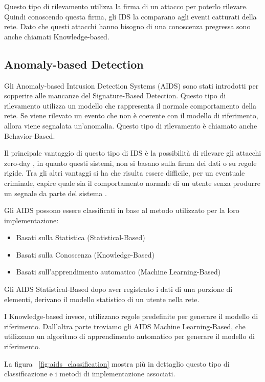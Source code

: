Questo tipo di rilevamento utilizza la firma di un attacco per poterlo rilevare. Quindi conoscendo questa firma, gli IDS la comparano agli eventi catturati della rete. Dato che questi attacchi hanno bisogno di una conoscenza pregressa sono anche chiamati Knowledge-based.


\subsection{Anomaly-based Detection}

Gli Anomaly-based Intrusion Detection Systems (AIDS) sono stati introdotti per sopperire alle mancanze del Signature-Based Detection.
Questo tipo di rilevamento utilizza un modello che rappresenta il normale comportamento della rete. Se viene rilevato un evento che non è coerente con il modello di riferimento, allora viene segnalata un'anomalia. Questo tipo di rilevamento è chiamato anche Behavior-Based.


Il principale vantaggio di questo tipo di IDS è la possibilità di rilevare gli attacchi zero-day \cite{UnsupervisedAlgorithmsDetect2021}, in quanto questi sistemi, non si basano sulla firma dei dati o su regole rigide. Tra gli altri vantaggi si ha che risulta essere difficile, per un eventuale criminale, capire quale sia il comportamento normale di un utente senza produrre un segnale da parte del sistema \cite{SurveyIntrusionDetection2019}.


Gli AIDS possono essere classificati in base al metodo utilizzato per la loro implementazione:

\begin{itemize}
    \item Basati sulla Statistica (Statistical-Based)
    \item Basati sulla Conoscenza (Knowledge-Based)
    \item Basati sull'apprendimento automatico (Machine Learning-Based)
\end{itemize}


Gli AIDS Statistical-Based dopo aver registrato i dati di una porzione di elementi, derivano il modello statistico di un utente nella rete. 


I Knowledge-based invece, utilizzano regole predefinite per generare il modello di riferimento.
Dall'altra parte troviamo gli AIDS Machine Learning-Based, che utilizzano un algoritmo di apprendimento automatico per generare il modello di riferimento. 

La figura ~\ref{fig:aids_classification} mostra più in dettaglio questo tipo di classificazione e i metodi di implementazione associati.

